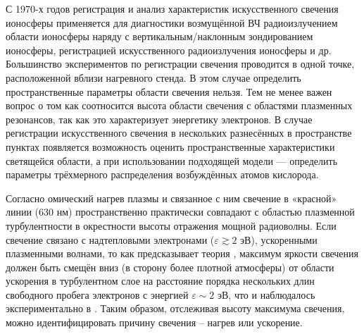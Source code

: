 \documentclass[12pt,a4paper]{article}
\begin{document}

С 1970-х годов регистрация и анализ характеристик искусственного свечения ионосферы применяется для диагностики возмущённой ВЧ радиоизлучением области ионосферы \cite{BIONDI1970} наряду с вертикальным/наклонным зондированием ионосферы, регистрацией искусственного радиоизлучения ионосферы и др. 
Большинство экспериментов по регистрации свечения проводится в одной точке, расположенной вблизи нагревного стенда. В этом случае определить пространственные параметры области свечения нельзя. Тем не менее важен вопрос о том как соотносится высота области свечения с областями плазменных резонансов, так как это характеризует энергетику электронов.
В случае регистрации искусственного свечения в нескольких разнесённых в пространстве пунктах появляется возможность оценить пространственные характеристики светящейся области, а при использовании подходящей модели --- определить параметры трёхмерного распределения возбуждённых атомов кислорода. 

Согласно \cite{Mantas1996} омический нагрев плазмы и связанное с ним свечение в «красной» линии (630 нм) пространственно практически совпадают с областью плазменной турбулентности в окрестности высоты отражения мощной радиоволны. Если свечение связано с надтепловыми электронами ($\varepsilon \gtrsim 2$ эВ), ускоренными плазменными волнами, то как предсказывает теория \cite{Vaskov1983,Gurevich1985}, максимум яркости свечения должен быть смещён вниз (в сторону более плотной атмосферы) от области ускорения в турбулентном слое на расстояние порядка нескольких длин свободного пробега электронов с энергией $\varepsilon \sim 2$ эВ, что и наблюдалось экспериментально в \cite{HASLETT1974,Gustavsson2001,Gustavsson2008}. Таким образом, отслеживая высоту максимума свечения, можно идентифицировать причину свечения – нагрев или ускорение.
\end{document}
